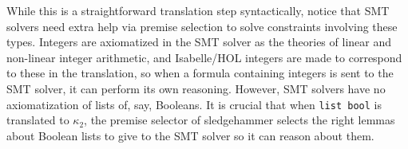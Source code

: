 \documentclass{article}
\begin{document}
		While this is a straightforward
		translation step syntactically, 
		notice that SMT solvers need 
		extra help via premise selection 
		to solve constraints involving 
		these types. Integers are 
		axiomatized in the SMT solver as 
		the theories of linear and 
		non-linear integer arithmetic, and 
		Isabelle/HOL integers are made to 
		correspond to these in the translation, 
		so when a formula containing 
		integers is sent to the SMT solver, 
		it can perform its own reasoning. 
		However, SMT solvers have no 
		axiomatization of lists of, say, 
		Booleans. It is crucial that when 
		\texttt{list bool} is 
		translated to $\kappa_2$, the 
		premise selector of sledgehammer
		selects the right lemmas about 
		Boolean lists to give to the 
		SMT solver so it can reason 
		about them.
		 


\end{document}
